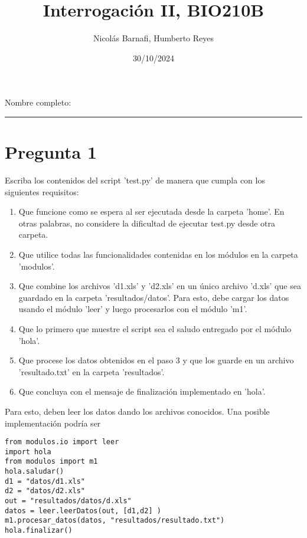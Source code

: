 \documentclass{article}
\title{Interrogación II, BIO210B}
\author{Nicolás Barnafi, Humberto Reyes}
\date{30/10/2024}
\begin{document}
Nombre completo: 
\hrule
{\let\newpage\relax\maketitle}


\section*{Pregunta 1}
    Escriba los contenidos del script 'test.py' de manera que cumpla con los siguientes requisitos: 
    \begin{enumerate}
        \item Que funcione como se espera al ser ejecutada desde la carpeta 'home'. En otras palabras, no considere la dificultad de ejecutar test.py desde otra carpeta.
        \item Que utilice todas las funcionalidades contenidas en los módulos en la carpeta 'modulos'.
        \item Que combine los archivos 'd1.xls' y 'd2.xls' en un único archivo 'd.xls' que sea guardado en la carpeta 'resultados/datos'. Para esto, debe cargar los datos usando el módulo 'leer' y luego procesarlos con el módulo 'm1'.

        \item Que lo primero que muestre el script sea el saludo entregado por el módulo 'hola'.
        \item Que procese los datos obtenidos en el paso 3 y que los guarde en un archivo 'resultado.txt' en la carpeta 'resultados'.
        \item Que concluya con el mensaje de finalización implementado en 'hola'.
    \end{enumerate}
Para esto, deben leer los datos dando los archivos conocidos. Una posible implementación podría ser

\begin{verbatim}
from modulos.io import leer
import hola
from modulos import m1
hola.saludar()
d1 = "datos/d1.xls"
d2 = "datos/d2.xls"
out = "resultados/datos/d.xls"
datos = leer.leerDatos(out, [d1,d2] )
m1.procesar_datos(datos, "resultados/resultado.txt")
hola.finalizar()
\end{verbatim}
\end{document}
